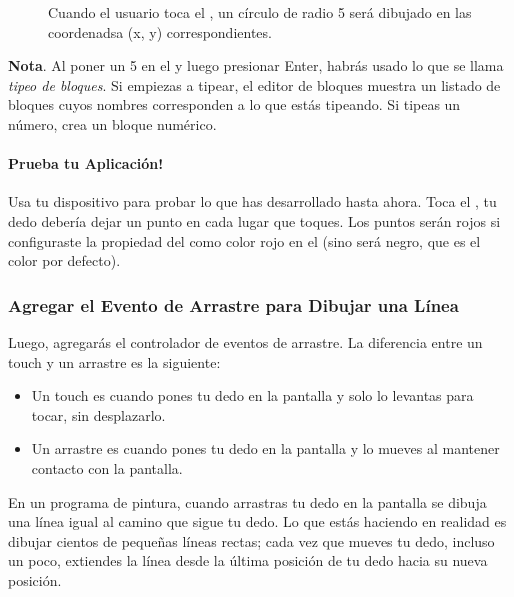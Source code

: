 \begin{enumerate}
\begin{figure}[H]
\centering
\caption{Cuando el usuario toca el , un
  círculo de radio 5 será dibujado en las coordenadsa (x, y)
  correspondientes.}
\label{fig:PaintPot9}
\end{figure}

  \textbf{Nota}. Al poner un 5 en el \blockEditor y luego presionar
  Enter, habrás usado lo que se llama \emph{tipeo de bloques}. Si
  empiezas a tipear, el editor de bloques muestra un listado de
  bloques cuyos nombres corresponden a lo que estás tipeando. Si
  tipeas un número, crea un bloque numérico.

  \paragraph{Prueba tu Aplicación!} Usa tu dispositivo para probar lo
  que has desarrollado hasta ahora. Toca el
  , tu dedo debería dejar un punto en cada
  lugar que toques. Los puntos serán rojos si configuraste la
  propiedad del  como color
  rojo en el \designer (sino será negro, que es el color por defecto).

\end{enumerate}

\subsubsection*{Agregar el Evento de Arrastre para Dibujar una Línea}

Luego, agregarás el controlador de eventos de arrastre. La diferencia
entre un touch y un arrastre es la siguiente:
	
\begin{itemize}
\item Un touch es cuando pones tu dedo en la pantalla y solo lo
  levantas para tocar, sin desplazarlo.

\item Un arrastre es cuando pones tu dedo en la pantalla y lo mueves
  al mantener contacto con la pantalla.
\end{itemize}
	
En un programa de pintura, cuando arrastras tu dedo en la pantalla se
dibuja una línea igual al camino que sigue tu dedo. Lo que estás
haciendo en realidad es dibujar cientos de pequeñas líneas rectas;
cada vez que mueves tu dedo, incluso un poco, extiendes la línea desde
la última posición de tu dedo hacia su nueva posición.

